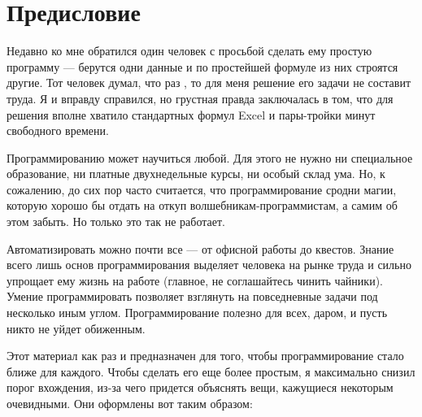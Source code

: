 \documentclass[book.tex]{subfiles}
\begin{document}
%


\maketitle %

\section*{Предисловие}

Недавно ко мне обратился один человек с просьбой сделать ему простую программу --- берутся одни данные и по простейшей формуле из них строятся другие. Тот человек думал, что раз \grqq, то для меня решение его задачи не составит труда. Я и вправду справился, но грустная правда заключалась в том, что для решения вполне хватило стандартных формул Excel и пары-тройки минут свободного времени.

Программированию может научиться любой. Для этого не нужно ни специальное образование, ни платные двухнедельные курсы, ни особый склад ума. Но, к сожалению, до сих пор часто считается, что программирование сродни магии, которую хорошо бы отдать на откуп волшебникам-программистам, а самим об этом забыть. Но только это так не работает. 

Автоматизировать можно почти все --- от офисной работы до квестов. Знание всего лишь основ программирования выделяет человека на рынке труда и сильно упрощает ему жизнь на работе (главное, не соглашайтесь чинить чайники). Умение программировать позволяет взглянуть на повседневные задачи под несколько иным углом. Программирование полезно для всех, даром, и пусть никто не уйдет обиженным.

Этот материал как раз и предназначен для того, чтобы программирование стало ближе для каждого. Чтобы сделать его еще более простым, я максимально снизил порог вхождения, из-за чего придется объяснять вещи, кажущиеся некоторым очевидными. Они оформлены вот таким образом:

\end{document}
